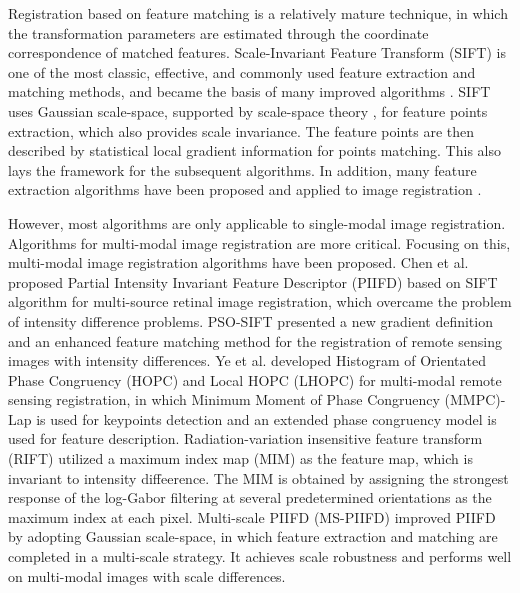 Registration based on feature matching is a relatively mature technique, in which the transformation parameters are estimated through the coordinate correspondence of matched features. Scale-Invariant Feature Transform (SIFT) \cite{lowe1999object,lowe2001local,lowe2004distinctive} is one of the most classic, effective, and commonly used feature extraction and matching methods, and became the basis of many improved algorithms \cite{ke2004pca,mikolajczyk2005performance,bay2006surf,morel2009asift,sedaghat2011uniform,dellinger2014sar,sedaghat2015remote}. SIFT uses Gaussian scale-space, supported by scale-space theory \cite{lindeberg1994scale}, for feature points extraction, which also provides scale invariance. The feature points are then described by statistical local gradient information for points matching. This also lays the framework for the subsequent algorithms. In addition, many feature extraction algorithms have been proposed and applied to image registration \cite{moravec1980obstacle,harris1988combined,dalal2005histograms,rosten2008faster,calonder2011brief,rublee2011orb,leutenegger2011brisk,alahi2012freak,alcantarilla2012kaze,ye2019fast}.

However, most algorithms are only applicable to single-modal image registration. Algorithms for multi-modal image registration are more critical. Focusing on this, multi-modal image registration algorithms have been proposed. Chen et al. \cite{chen2010partial} proposed Partial Intensity Invariant Feature Descriptor (PIIFD) based on SIFT algorithm for multi-source retinal image registration, which overcame the problem of intensity difference problems. PSO-SIFT \cite{ma2016remote} presented a new gradient definition and an enhanced feature matching method for the registration of remote sensing images with intensity differences. Ye et al. developed Histogram of Orientated Phase Congruency (HOPC) \cite{ye2017robust} and Local HOPC (LHOPC) \cite{ye2018local} for multi-modal remote sensing registration, in which Minimum Moment of Phase Congruency (MMPC)-Lap is used for keypoints detection and an extended phase congruency model is used for feature description. Radiation-variation insensitive feature transform (RIFT) \cite{li2019rift} utilized a maximum index map (MIM) as the feature map, which is invariant to intensity diffeerence. The MIM is obtained by assigning the strongest response of the log-Gabor filtering at several predetermined orientations as the maximum index at each pixel. Multi-scale PIIFD (MS-PIIFD) \cite{2021Multi} improved PIIFD by adopting Gaussian scale-space, in which feature extraction and matching are completed in a multi-scale strategy. It achieves scale robustness and performs well on multi-modal images with scale differences.

